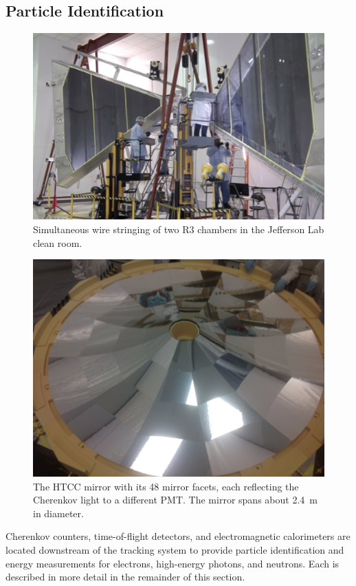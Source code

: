 \documentclass[final,3p,twocolumn]{elsarticle}
\begin{document}
\subsection{Particle Identification}
\begin{figure}[htbp!]
\centerline{\includegraphics[width=1.65\columnwidth]{DC-R3.png}}
\caption{Simultaneous wire stringing of two R3 chambers in the Jefferson Lab clean room.}
\label{dc-stringing}
\end{figure}
\begin{figure}[ht!]
\centerline{\includegraphics[angle=90,width=0.75\columnwidth]{HTCC-mirror.png}}
\caption{The HTCC mirror with its 48 mirror facets, each reflecting the Cherenkov light to a different PMT. The
  mirror spans about 2.4~m in diameter.}
\label{htcc}
\end{figure}
Cherenkov counters, time-of-flight detectors, and electromagnetic calorimeters are located downstream of the
tracking system to provide particle identification and energy measurements for electrons, high-energy photons,
and neutrons.  Each is described in more detail in the remainder of this section.
\end{document}
